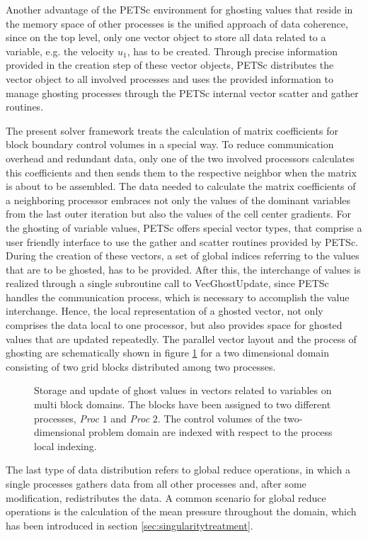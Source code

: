 Another advantage of the PETSc environment for ghosting values that reside in the memory space of other processes is the unified approach of data coherence, since on the top level, only one vector object to store all data related to a variable, e.g. the velocity \(u_1\), has to be created. Through precise information provided in the creation step of these vector objects, PETSc distributes the vector object to all involved processes and uses the provided information to manage ghosting processes through the PETSc internal vector scatter and gather routines. 

The present solver framework treats the calculation of matrix coefficients for block boundary control volumes in a special way. To reduce communication overhead and redundant data, only one of the two involved processors calculates this coefficients and then sends them to the respective neighbor when the matrix is about to be assembled. The data needed to calculate the matrix coefficients of a neighboring processor embraces not only the values of the dominant variables from the last outer iteration but also the values of the cell center gradients. For the ghosting of variable values, PETSc offers special vector types, that comprise a user friendly interface to use the gather and scatter routines provided by PETSc. During the creation of these vectors, a set of global indices referring to the values that are to be ghosted, has to be provided. After this, the interchange of values is realized through a single subroutine call to \textrm{VecGhostUpdate}, since PETSc handles the communication process, which is necessary to accomplish the value interchange. Hence, the local representation of a ghosted vector, not only comprises the data local to one processor, but also provides space for ghosted values that are updated repeatedly. The parallel vector layout and the process of ghosting are schematically shown in figure \ref{fig:ghosting} for a two dimensional domain consisting of two grid blocks distributed among two processes.

\begin{figure}
  \centering
  \label{fig:segassemble}
  
  \caption{Storage and update of ghost values in vectors related to variables on multi block domains. The blocks have been assigned to two different processes, \emph{Proc} $1$ and \emph{Proc} $2$. The control volumes of the two-dimensional problem domain are indexed with respect to the process local indexing.}
  \label{fig:ghosting}
\end{figure}

The last type of data distribution refers to global reduce operations, in which a single processes gathers data from all other processes and, after some modification, redistributes the data. A common scenario for global reduce operations is the calculation of the mean pressure throughout the domain, which has been introduced in section \ref{sec:singularitytreatment}.



